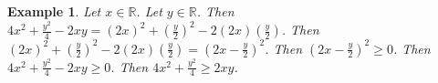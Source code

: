 \documentclass[12pt]{article}
\newtheorem{example}{Example}
\begin{document}
\begin{example}
    Let $x\in\mathbb{R}$. Let $y\in\mathbb{R}$.
    Then $4 x^2 + \frac{y^2}{4} - 2 x y = {(2 x)}^2 + {(\frac{y}{2})}^2 - 2 (2 x) (\frac{y}{2})$.
    Then ${(2 x)}^2 + {(\frac{y}{2})}^2 - 2 (2 x) (\frac{y}{2}) = {(2 x - \frac{y}{2})}^2$.
    Then ${(2 x - \frac{y}{2})}^2 \ge 0$.
    Then $4 x^2 + \frac{y^2}{4} - 2 x y \ge 0$.
    Then $4 x^2 + \frac{y^2}{4} \ge 2 x y$.
\end{example}
\end{document}
